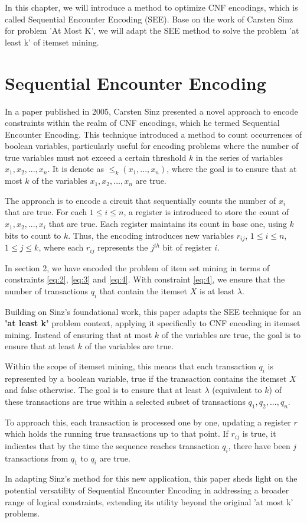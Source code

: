 In this chapter, we will introduce a method to optimize CNF encodings, which is called Sequential Encounter Encoding (SEE).
Base on the work of Carsten Sinz for problem 'At Most K',
we will adapt the SEE method to solve the problem 'at least k' of itemset mining.


\section{Sequential Encounter Encoding}

In a paper published in 2005, Carsten Sinz\cite{carstensinz} presented a novel approach to encode constraints within the realm of CNF encodings,
which he termed Sequential Encounter Encoding.
This technique introduced a method to count occurrences of boolean variables,
particularly useful for encoding problems where the number of true variables
must not exceed a certain threshold $k$ in the series of variables $x_1, x_2, ..., x_n$.
It is denote as $\le _k(x_1,...,x_n)$, where the goal is to ensure that at most $k$ of the variables $x_1, x_2,..., x_n$ are true.

The approach is to encode a circuit that sequentially counts the number of $x_i$ that are true.
For each $1 \le i \le n$, a register is introduced to store the count of $x_1, x_2,..., x_i$ that are true.
Each register maintains its count in base one, using $k$ bits to count to $k$.
Thus, the encoding introduces new variables $r_{ij}$, $1 \le i \le n$, $1 \le j \le k$, where each $r_{ij}$ represents the $j^{th}$ bit of register $i$.

In section 2, we have encoded the problem of item set mining in terms of constraints \ref{eq:2}, \ref{eq:3} and \ref{eq:4}.
With constraint \ref{eq:4}, we ensure that the number of transactions $q_i$ that contain the itemset $X$ is at least $\lambda$.

Building on Sinz's foundational work, this paper adapts the SEE technique
for an \textbf{'at least k'} problem context,
applying it specifically to CNF encoding in itemset mining.
Instead of ensuring that at most $k$ of the variables are true, the goal is to ensure that at least $k$ of the variables are true.

Within the scope of itemset mining, this means that each transaction $q_i$ is represented by a boolean variable,
true if the transaction contains the itemset $X$ and false otherwise.
The goal is to ensure that at least $\lambda$ (equivalent to $k$)
of these transactions are true within a selected subset of transactions $q_1, q_2,..., q_n$.

To approach this, each transaction is processed one by one, updating a register $r$ which holds the running true transactions up to that point.
If $r_{ij}$ is true, it indicates that by the time the sequence reaches transaction $q_i$, there have been $j$ transactions from $q_1$ to $q_i$ are true.

In adapting Sinz's method for this new application, this paper sheds light on the potential versatility of Sequential Encounter Encoding in addressing a broader range of logical constraints, extending its utility beyond the original 'at most k' problems.
